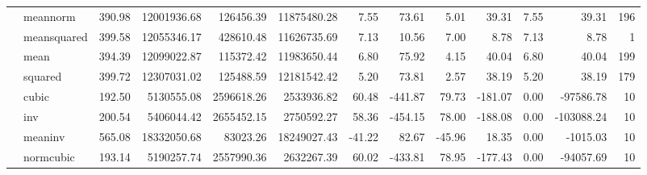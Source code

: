\begin{tabular}{llrrrrrrrrrrr}
 & meannorm & 390.98 & 12001936.68 & 126456.39 & 11875480.28 & 7.55 & 73.61 & 5.01 & 39.31 & 7.55 & 39.31 & 196 \\
 & meansquared & 399.58 & 12055346.17 & 428610.48 & 11626735.69 & 7.13 & 10.56 & 7.00 & 8.78 & 7.13 & 8.78 & 1 \\
 & mean & 394.39 & 12099022.87 & 115372.42 & 11983650.44 & 6.80 & 75.92 & 4.15 & 40.04 & 6.80 & 40.04 & 199 \\
 & squared & 399.72 & 12307031.02 & 125488.59 & 12181542.42 & 5.20 & 73.81 & 2.57 & 38.19 & 5.20 & 38.19 & 179 \\
 & cubic & 192.50 & 5130555.08 & 2596618.26 & 2533936.82 & 60.48 & -441.87 & 79.73 & -181.07 & 0.00 & -97586.78 & 10 \\
 & inv & 200.54 & 5406044.42 & 2655452.15 & 2750592.27 & 58.36 & -454.15 & 78.00 & -188.08 & 0.00 & -103088.24 & 10 \\
 & meaninv & 565.08 & 18332050.68 & 83023.26 & 18249027.43 & -41.22 & 82.67 & -45.96 & 18.35 & 0.00 & -1015.03 & 10 \\
 & normcubic & 193.14 & 5190257.74 & 2557990.36 & 2632267.39 & 60.02 & -433.81 & 78.95 & -177.43 & 0.00 & -94057.69 & 10 \\
\cline{1-13}
\bottomrule
\end{tabular}

